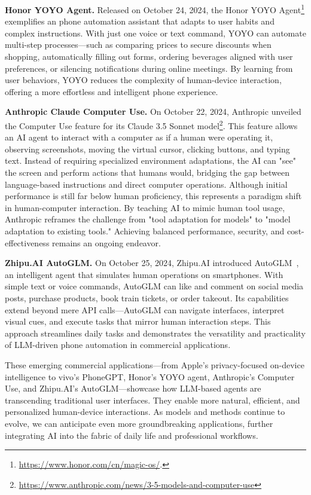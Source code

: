 \noindent\textbf{Honor YOYO Agent.}
Released on October 24, 2024, the Honor YOYO Agent\footnote{\href{https://www.honor.com/cn/magic-os/}{https://www.honor.com/cn/magic-os/}.} exemplifies an phone automation assistant that adapts to user habits and complex instructions. With just one voice or text command, YOYO can automate multi-step processes—such as comparing prices to secure discounts when shopping, automatically filling out forms, ordering beverages aligned with user preferences, or silencing notifications during online meetings. By learning from user behaviors, YOYO reduces the complexity of human-device interaction, offering a more effortless and intelligent phone experience.


\noindent\textbf{Anthropic Claude Computer Use.}
On October 22, 2024, Anthropic unveiled the Computer Use feature for its Claude 3.5 Sonnet model\footnote{\href{https://www.anthropic.com/news/3-5-models-and-computer-use}{https://www.anthropic.com/news/3-5-models-and-computer-use}}. This feature allows an AI agent to interact with a computer as if a human were operating it, observing screenshots, moving the virtual cursor, clicking buttons, and typing text. Instead of requiring specialized environment adaptations, the AI can "see" the screen and perform actions that humans would, bridging the gap between language-based instructions and direct computer operations. Although initial performance is still far below human proficiency, this represents a paradigm shift in human-computer interaction. By teaching AI to mimic human tool usage, Anthropic reframes the challenge from "tool adaptation for models" to "model adaptation to existing tools." Achieving balanced performance, security, and cost-effectiveness remains an ongoing endeavor.


\noindent\textbf{Zhipu.AI AutoGLM.}
On October 25, 2024, Zhipu.AI introduced AutoGLM~\cite{liu2024autoglm}, an intelligent agent that simulates human operations on smartphones. With simple text or voice commands, AutoGLM can like and comment on social media posts, purchase products, book train tickets, or order takeout. Its capabilities extend beyond mere API calls—AutoGLM can navigate interfaces, interpret visual cues, and execute tasks that mirror human interaction steps. This approach streamlines daily tasks and demonstrates the versatility and practicality of LLM-driven phone automation in commercial applications.


These emerging commercial applications—from Apple's privacy-focused on-device intelligence to vivo's PhoneGPT, Honor's YOYO agent, Anthropic's Computer Use, and Zhipu.AI's AutoGLM—showcase how LLM-based agents are transcending traditional user interfaces. They enable more natural, efficient, and personalized human-device interactions. As models and methods continue to evolve, we can anticipate even more groundbreaking applications, further integrating AI into the fabric of daily life and professional workflows.
